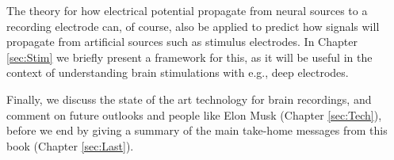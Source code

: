 The theory for how electrical potential propagate from neural sources to a recording electrode can, of course, also be applied to predict how signals will propagate from artificial sources such as stimulus electrodes. In Chapter \ref{sec:Stim} we briefly present a framework for this, as it will be useful in the context of understanding brain stimulations with e.g., deep electrodes.

Finally, we discuss the state of the art technology for brain recordings, and comment on future outlooks and people like Elon Musk (Chapter \ref{sec:Tech}), before we end  by giving a summary of the main take-home messages from this book (Chapter \ref{sec:Last}).
